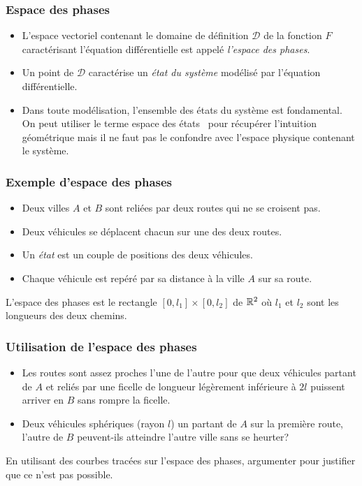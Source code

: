 \begin{frame}
  \frametitle{Espace des phases}
\begin{itemize}
  \item L'espace vectoriel contenant le domaine de définition $\mathcal{D}$ de la fonction $F$ caractérisant l'équation différentielle est appelé \emph{l'espace des phases}.
  \item Un point de $\mathcal{D}$ caractérise un \emph{état du système} modélisé par l'équation différentielle.
  \item Dans toute modélisation, l'ensemble des états du système est fondamental. On peut utiliser le terme \og espace des états\fg ~ pour récupérer l'intuition géométrique mais il ne faut pas le confondre avec l'espace physique contenant le système.
\end{itemize}
\end{frame}

\begin{frame}
  \frametitle{Exemple d'espace des phases}
\begin{itemize}
  \item Deux villes $A$ et $B$ sont reliées par deux routes qui ne se croisent pas. 
  \item Deux véhicules se déplacent chacun sur une des deux routes.
  \item Un \emph{état} est un couple de positions des deux véhicules.
  \item Chaque véhicule est repéré par sa distance à la ville $A$ sur sa route.
\end{itemize}
 L'espace des phases est le rectangle $[0,l_1]\times[0,l_2]$ de $\mathbb{R}^2$ où $l_1$ et $l_2$ sont les longueurs des deux chemins.
\end{frame}

\begin{frame}
\frametitle{Utilisation de l'espace des phases}
\begin{itemize}
  \item Les routes sont assez proches l'une de l'autre pour que deux véhicules partant de $A$ et reliés par une ficelle de longueur légèrement inférieure à $2l$ puissent arriver en $B$ sans rompre la ficelle.
  \item Deux véhicules sphériques (rayon $l$) un partant de $A$ sur la première route, l'autre de $B$ peuvent-ils atteindre l'autre ville sans se heurter?
\end{itemize}

En utilisant des courbes tracées sur l'espace des phases, argumenter pour justifier que ce n'est pas possible.
\end{frame}

